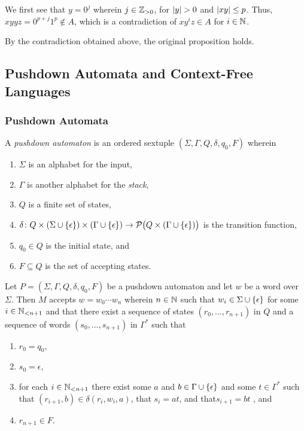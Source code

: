     We first see that \(y = 0^j\) wherein \(j \in \posint\), for \(\abs{y} > 0\)
    and \(\abs{x y} \leq p\). Thus, \(x y y z = 0^{p + j} 1^p \not\in A\), which
    is a contradiction of \(x y^i z \in A\) for \(i \in \setnat\).

    By the contradiction obtained above, the original proposition holds.
\Esl

\subsection{Pushdown Automata and Context-Free Languages}

\subsubsection{Pushdown Automata}

\Bdf
    A \emph{pushdown automaton} is an ordered sextuple \((\Sigma, \Gamma, Q,
    \delta, q_0, F)\) wherein
    \begin{enumerate}
        \item \(\Sigma\) is an alphabet for the input,
        \item \(\Gamma\) is another alphabet for the \emph{stack},
        \item \(Q\) is a finite set of states,
        \item \(\map{\delta}{Q \times (\Sigma \cup \set{\epsilon}) \times
        (\Gamma \cup \set{\epsilon})}{\pow\big(Q \times (\Gamma \cup
        \set{\epsilon})\big)}\) is the transition function,
        \item \(q_0 \in Q\) is the initial state, and
        \item \(F \subseteq Q\) is the set of accepting states.
    \end{enumerate}
\Edf

Let \(P = (\Sigma, \Gamma, Q, \delta, q_0, F)\) be a pushdown automaton and let
\(w\) be a word over \(\Sigma\). Then \(M\) accepts \(w = w_0 \cdots w_n\)
wherein \(n \in \setnat\) such that \(w_i \in \Sigma \cup \set{\epsilon}\) for
some \(i \in \Nln[n + 1]\) and that there exist a sequence of states \((r_0,
\ldots, r_{n + 1})\) in \(Q\) and a sequence of words \((s_0, \ldots, s_{n +
1})\) in \(\Gamma^*\) such that
\begin{enumerate}
    \item \(r_0 = q_0\),
    \item \(s_0 = \epsilon\),
    \item for each \(i \in \Nln[n + 1]\) there exist some \(a\) and \(b \in
    \Gamma \cup \set{\epsilon}\) and some \(t \in \Gamma^*\) such that \((r_{i +
    1}, b) \in \delta(r_i, w_i, a)\), that \(s_i = a t\), and that\(s_{i + 1} =
    b t\) , and \item \(r_{n + 1} \in F\).
\end{enumerate}

